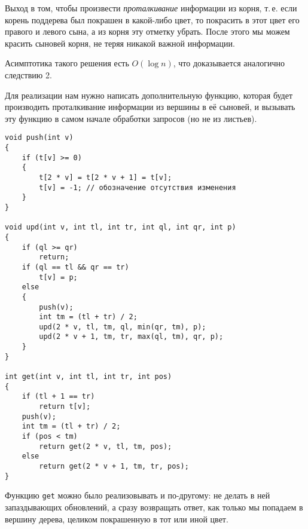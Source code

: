 Выход в том, чтобы произвести \textit{проталкивание} информации из корня, т.\,е. если корень поддерева был покрашен в какой-либо цвет, то покрасить в этот цвет его правого и левого сына, а из корня эту отметку убрать. После этого мы можем красить сыновей корня, не теряя никакой важной информации.

Асимптотика такого решения есть $O(\log n)$, что доказывается аналогично следствию 2.

Для реализации нам нужно написать дополнительную функцию, которая будет производить проталкивание информации из вершины в её сыновей, и вызывать эту функцию в самом начале обработки запросов (но не из листьев).


\begin{verbatim}
void push(int v)
{
    if (t[v] >= 0)
    {
        t[2 * v] = t[2 * v + 1] = t[v];
        t[v] = -1; // обозначение отсутствия изменения
    }
}

void upd(int v, int tl, int tr, int ql, int qr, int p)
{
    if (ql >= qr)
        return;
    if (ql == tl && qr == tr)
        t[v] = p;
    else
    {
        push(v);
        int tm = (tl + tr) / 2;
        upd(2 * v, tl, tm, ql, min(qr, tm), p);
        upd(2 * v + 1, tm, tr, max(ql, tm), qr, p);
    }
}

int get(int v, int tl, int tr, int pos)
{
    if (tl + 1 == tr)
        return t[v];
    push(v);
    int tm = (tl + tr) / 2;
    if (pos < tm)
        return get(2 * v, tl, tm, pos);
    else
        return get(2 * v + 1, tm, tr, pos);
}
\end{verbatim}

\begin{remark}
    Функцию \texttt{get} можно было реализовывать и по-другому: не делать в ней запаздывающих обновлений, а сразу возвращать ответ, как только мы попадаем в вершину дерева, целиком покрашенную в тот или иной цвет.
\end{remark}
